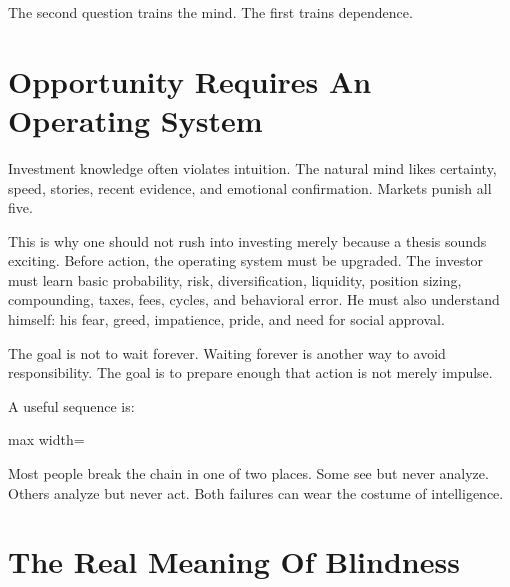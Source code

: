The second question trains the mind. The first trains dependence.

\section*{Opportunity Requires An Operating System}

Investment knowledge often violates intuition. The natural mind likes certainty, speed, stories, recent evidence, and emotional confirmation. Markets punish all five.

This is why one should not rush into investing merely because a thesis sounds exciting. Before action, the operating system must be upgraded. The investor must learn basic probability, risk, diversification, liquidity, position sizing, compounding, taxes, fees, cycles, and behavioral error. He must also understand himself: his fear, greed, impatience, pride, and need for social approval.

The goal is not to wait forever. Waiting forever is another way to avoid responsibility. The goal is to prepare enough that action is not merely impulse.

A useful sequence is:

\begin{center}
\begin{adjustbox}{max width=\linewidth}
\end{adjustbox}
\end{center}

Most people break the chain in one of two places. Some see but never analyze. Others analyze but never act. Both failures can wear the costume of intelligence.

\section*{The Real Meaning Of Blindness}

